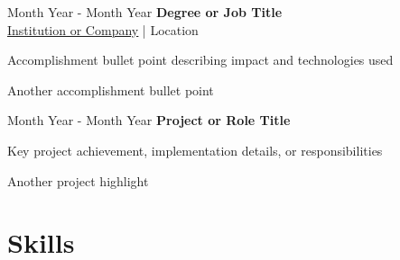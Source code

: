 
\begin{twocolentry}
    {Month Year - Month Year}
    {\textbf{Degree or Job Title} \\
    \href{https://organization-url.com}{\underline{Institution or Company}} | Location}
\end{twocolentry}
\vspace{0.10 cm}
\begin{onecolentry}
    \begin{highlights}
        \item Accomplishment bullet point describing impact and technologies used
        \item Another accomplishment bullet point
    \end{highlights}
\end{onecolentry}

\vspace{0.2 cm} %


\begin{twocolentry}
    {Month Year - Month Year}
    {\textbf{Project or Role Title} \\}
\end{twocolentry}
\vspace{0.10 cm}
\begin{onecolentry}
    \begin{highlights}
        \item Key project achievement, implementation details, or responsibilities
        \item Another project highlight
    \end{highlights}
\end{onecolentry}

\vspace{0.2 cm} %


\section{Skills}

